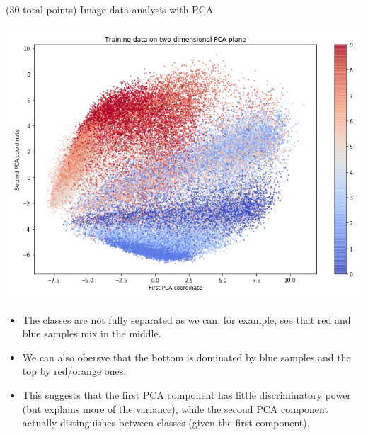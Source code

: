 \documentclass[12pt]{article}
\begin{document}
\begin{question}{(30 total points) Image data analysis with PCA}
\begin{subquestion}
   

      \begin{answerbox}{40em}
         \begin{center}
	\includegraphics[width=\textwidth]{imgs/1_8.png}
	\end{center}
	\begin{itemize}
	\itemsep -3pt {}
	\item The classes are not fully separated as we can, for example, see that red and blue samples mix in the middle.
	\item We can also obersve that the bottom is dominated by blue samples and the top by red/orange ones. 
	\item This suggests that the first PCA component has little discriminatory power (but explains more of the variance), while the second PCA component actually distinguishes between classes (given the first component).
	\end{itemize}
      \end{answerbox}
  


   \end{subquestion}
   

\end{question}
\clearpage
%
%
\end{document}
